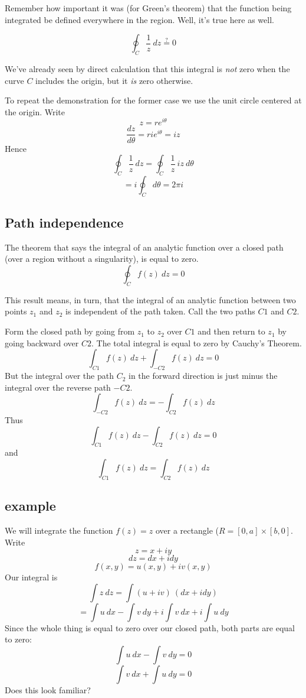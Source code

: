 \documentclass[11pt, oneside]{article}
\begin{document}
Remember how important it was (for Green's theorem) that the function being integrated be defined everywhere in the region.  Well, it's true here as well.

\[ \oint_C \frac{1}{z} \ dz \stackrel{?}{=} 0 \]

We've already seen by direct calculation that this integral is \emph{not} zero when the curve $C$ includes the origin, but it \emph{is} zero otherwise.

To repeat the demonstration for the former case we use the unit circle centered at the origin.  Write
\[ z = r e^{i\theta} \]
\[  \frac{dz}{d\theta} = r i e^{i\theta} = iz \]
Hence
\[ \oint_C \frac{1}{z} \ dz = \oint_C \frac{1}{z} \ iz \ d \theta \]
\[ = i   \oint_C  d \theta = 2 \pi i \]

\subsection*{Path independence}
The theorem that says the integral of an analytic function over a closed path (over a region without a singularity), is equal to zero.
\[ \oint_C f(z) \ dz = 0 \]

This result means, in turn, that the integral of an analytic function between two points $z_1$ and $z_2$ is independent of the path taken.  Call the two paths $C1$ and $C2$.  

Form the closed path by going from $z_1$ to $z_2$ over $C1$ and then return to $z_1$ by going backward over $C2$.  The total integral is equal to zero by Cauchy's Theorem.
\[ \int_{C1} f(z) \ dz + \int_{-C2} f(z) \ dz = 0 \]
But the integral over the path $C_2$ in the forward direction is just minus the integral over the reverse path $-C2$.
\[ \int_{-C2} f(z) \ dz = - \int_{C2} f(z) \ dz \]
Thus
\[ \int_{C1} f(z) \ dz - \int_{C2} f(z) \ dz = 0 \]
and
\[ \int_{C1} f(z) \ dz = \int_{C2} f(z) \ dz \]

\subsection*{example}

We will integrate the function $f(z) = z$ over a rectangle ($R = [0,a] \times [b,0]$.  Write
\[ z = x + i y \]
\[ dz = dx + i dy \]
\[ f(x,y) = u(x,y) + iv(x,y) \]
Our integral is
\[ \int z \ dz = \int (u + iv) \ (dx + i dy) \]
\[ = \int u \ dx - \int v \ dy + i \int v \ dx + i \int u \ dy \]
Since the whole thing is equal to zero over our closed path, both parts are equal to zero:
\[ \int u \ dx - \int v \ dy = 0 \]
\[ \int v \ dx + \int u \ dy = 0 \]
Does this look familiar?
\end{document}
